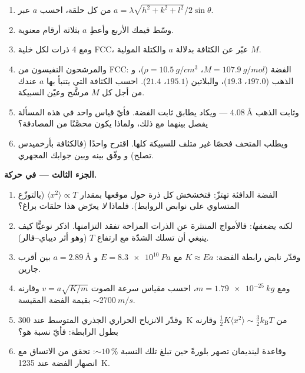 \begin{problem}
\begin{enumerate}[resume]
  \item من كل حلقة، احسب  $a$ عبر
        $a = \lambda\sqrt{h^2+k^2+l^2}/2\sin\theta$.
  \item وسّط قيمك الأربع وأعطِ $a$ بثلاثة
        أرقام معنوية.
  \item ومع 4 ذرات لكل خلية FCC، عبّر عن الكثافة بدلالة
        $a$ والكتلة المولية $M$.
  \item والمرشحون النفيسون من FCC: الفضة
        ($M = \qty{107.9}{g/mol}$، $\rho = \qty{10.5}{g/cm^3}$)، و
        الذهب ($197.0$، $19.3$)، والبلاتين ($195.1$، $21.4$).
        احسب الكثافة التي يتنبأ بها $a$ عندك من أجل كل $M$
        مرشَّح وعيّن السبيكة.
  \item وثابت  الذهب $\qty{4.08}{\angstrom}$ ---
        ويكاد يطابق ثابت الفضة. فأيّ قياس واحد في
        هذه المسألة يفصل بينهما مع ذلك، ولماذا يكون محصَّنًا
        من المصادفة؟
  \item ويطلب المتحف فحصًا غير متلف للسبيكة كلها.
        اقترح واحدًا (فالكثافة بأرخميدس تصلح) و
        وفّق بينه وبين جوابك المجهري.
\end{enumerate}

\medskip\noindent\textbf{الجزء الثالث ---  في حركة.}

\begin{enumerate}[resume]
  \item الفضة الدافئة تهتزّ: فتخشخش كل ذرة حول موقعها
        بمقدار $\langle x^2\rangle \propto T$ (بالتوزّع المتساوي على
        نوابض الروابط). فلماذا \emph{لا} يعرّض هذا حلقات براغ؟
  \item لكنه \emph{يضعفها}: فالأمواج المنتثرة عن الذرات المزاحة
        تفقد التزامنها. اذكر نوعيًّا كيف ينبغي أن تسلك
        الشدّة مع ارتفاع $T$ (وهو أثر
        ديباي--فالر).
  \item وقدّر نابض رابطة الفضة: $K \approx Ea$ مع
        $E = \qty{8.3e10}{Pa}$ و $a = \qty{2.89}{\angstrom}$
        بين أقرب جارين.
  \item ومع $m = \qty{1.79e-25}{kg}$، احسب مقياس سرعة
        الصوت $v = a\sqrt{K/m}$ وقارنه بقيمة الفضة المقيسة
        $\sim\qty{2700}{m/s}$.
  \item وقدّر الانزياح الحراري الجذري المتوسط عند \qty{300}{K}
        من $\tfrac12K\langle x^2\rangle \sim
        \tfrac32k_{\text{B}}T$ وقارنه بطول
        الرابطة: فأيّ نسبة هو؟
  \item وقاعدة لينديمان تصهر بلورةً حين تبلغ تلك النسبة
        $\sim10\,\%$: تحقق من الاتساق مع انصهار الفضة
        عند \qty{1235}{K}.
\end{enumerate}


\end{problem}
